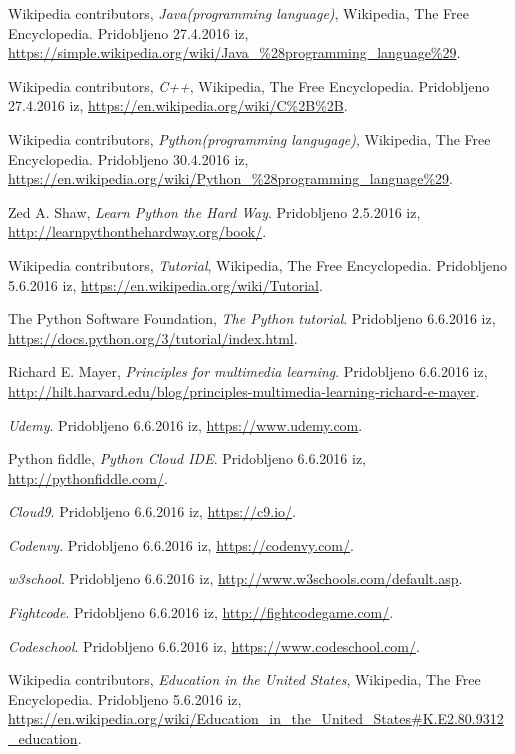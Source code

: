 \begin{thebibliography}{9}
 Wikipedia contributors, \emph{Java(programming
    language)}, Wikipedia, The Free Encyclopedia. Pridobljeno
  27.4.2016 iz,
  \url{https://simple.wikipedia.org/wiki/Java_%28programming_language%29}.

 Wikipedia contributors, \emph{C++}, Wikipedia, The
  Free Encyclopedia. Pridobljeno 27.4.2016 iz,
  \url{https://en.wikipedia.org/wiki/C%2B%2B}.

 Wikipedia contributors, \emph{Python(programming
    langugage)}, Wikipedia, The
  Free Encyclopedia. Pridobljeno 30.4.2016 iz,
  \url{https://en.wikipedia.org/wiki/Python_%28programming_language%29}.

  Zed A. Shaw, \emph{Learn Python the Hard Way}. Pridobljeno 2.5.2016
  iz, \url{http://learnpythonthehardway.org/book/}.

 Wikipedia contributors, \emph{Tutorial},
  Wikipedia, The Free Encyclopedia. Pridobljeno 5.6.2016 iz,
  \url{https://en.wikipedia.org/wiki/Tutorial}.

 The Python Software Foundation, \emph{The
    Python tutorial}. Pridobljeno 6.6.2016 iz,
  \url{https://docs.python.org/3/tutorial/index.html}.

 Richard E. Mayer, \emph{Principles for multimedia learning}. Pridobljeno 6.6.2016 iz,
  \url{http://hilt.harvard.edu/blog/principles-multimedia-learning-richard-e-mayer}.

 \emph{Udemy}. Pridobljeno 6.6.2016 iz,
  \url{https://www.udemy.com}.

 Python fiddle, \emph{Python Cloud
    IDE}. Pridobljeno 6.6.2016 iz,
  \url{http://pythonfiddle.com/}.

 \emph{Cloud9}. Pridobljeno 6.6.2016 iz,
  \url{https://c9.io/}.

 \emph{Codenvy}. Pridobljeno 6.6.2016 iz,
  \url{https://codenvy.com/}.

 \emph{w3school}. Pridobljeno 6.6.2016 iz,
  \url{http://www.w3schools.com/default.asp}.

 \emph{Fightcode}. Pridobljeno 6.6.2016 iz,
  \url{http://fightcodegame.com/}.

 \emph{Codeschool}. Pridobljeno 6.6.2016 iz,
  \url{https://www.codeschool.com/}.

 Wikipedia contributors, \emph{Education in the
    United States}, Wikipedia, The Free Encyclopedia. Pridobljeno
  5.6.2016 iz,
  \url{https://en.wikipedia.org/wiki/Education_in_the_United_States#K.E2.80.9312_education}.


\end{thebibliography}
